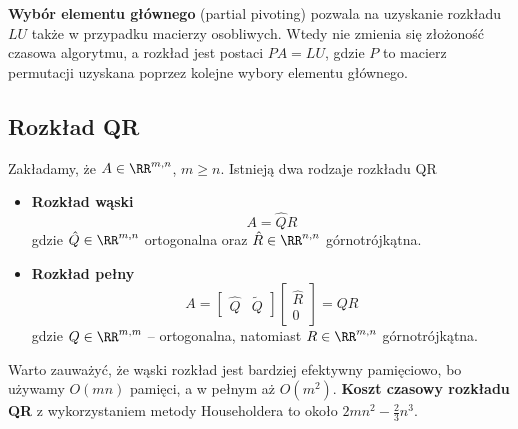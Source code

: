 \textbf{Wybór elementu głównego} (partial pivoting) pozwala na uzyskanie rozkładu $LU$ także w przypadku macierzy osobliwych. Wtedy nie zmienia się złożoność czasowa algorytmu, a rozkład jest postaci $PA=LU$, gdzie $P$ to macierz permutacji uzyskana poprzez kolejne wybory elementu głównego.

\subsection{Rozkład QR}
Zakładamy, że $A\in\RR^{m,n}$, $m \geq n$. Istnieją dwa rodzaje rozkładu QR
\begin{itemize}
    \item \textbf{Rozkład wąski}
    $$
    A=\hat{Q}\hat{R}
    $$
    gdzie $\hat{Q}\in\RR^{m,n}$ ortogonalna oraz $\hat{R}\in \RR^{n,n}$ górnotrójkątna.
    \item \textbf{Rozkład pełny}
    $$
    A = \begin{bmatrix}
        \hat{Q} & \tilde{Q}
    \end{bmatrix} \begin{bmatrix}
        \hat{R} \\ 0
    \end{bmatrix} = QR
    $$
    gdzie $Q\in\RR^{m,m}$ -- ortogonalna, natomiast $R\in\RR^{m,n}$ górnotrójkątna.
\end{itemize}
Warto zauważyć, że wąski rozkład jest bardziej efektywny pamięciowo, bo używamy $O(mn)$ pamięci, a w pełnym aż $O(m^2)$.\newline
\textbf{Koszt czasowy rozkładu QR} z wykorzystaniem metody Householdera to około $2mn^2 - \frac{2}{3}n^3$.

